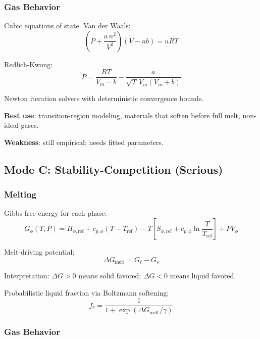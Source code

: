 \documentclass[11pt,a4paper]{article}
\begin{document}
\subsubsection{Gas Behavior}

Cubic equations of state. Van der Waals:
\begin{equation}
  \left(P + \frac{a\,n^2}{V^2}\right)(V - nb) = nRT
\end{equation}

Redlich-Kwong:
\begin{equation}
  P = \frac{RT}{V_m - b} - \frac{a}{\sqrt{T}\,V_m(V_m + b)}
\end{equation}

Newton iteration solvers with deterministic convergence bounds.

\textbf{Best use}: transition-region modeling, materials that soften
before full melt, non-ideal gases.

\textbf{Weakness}: still empirical; needs fitted parameters.

\subsection{Mode C: Stability-Competition (Serious)}

\subsubsection{Melting}

Gibbs free energy for each phase:
\begin{equation}
  G_\phi(T, P) = H_{\phi,\text{ref}} + c_{p,\phi}(T - T_{\text{ref}})
               - T\left[S_{\phi,\text{ref}} + c_{p,\phi}\ln\frac{T}{T_{\text{ref}}}\right]
               + PV_\phi
\end{equation}

Melt-driving potential:
\begin{equation}
  \Delta G_{\text{melt}} = G_\ell - G_s
\end{equation}

Interpretation: $\Delta G > 0$ means solid favored; $\Delta G < 0$ means
liquid favored.

Probabilistic liquid fraction via Boltzmann softening:
\begin{equation}
  f_\ell = \frac{1}{1 + \exp(\Delta G_{\text{melt}} / \gamma)}
\end{equation}

\subsubsection{Gas Behavior}
\end{document}
